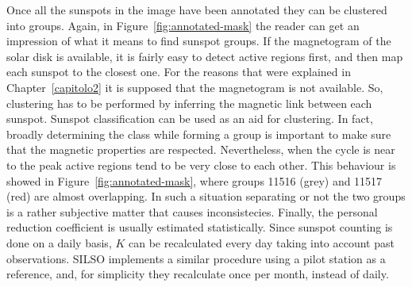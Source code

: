 \bigbreak
\noindent Once all the sunspots in the image have been annotated they can be clustered into groups. Again, in Figure~\ref{fig:annotated-mask} the reader can get an impression of what it means to find sunspot groups. If the magnetogram of the solar disk is available, it is fairly easy to detect active regions first, and then map each sunspot to the closest one. For the reasons that were explained in Chapter~\ref{capitolo2} it is supposed that the magnetogram is not available. So, clustering has to be performed by inferring the magnetic link between each sunspot. Sunspot classification can be used as an aid for clustering. In fact, broadly determining the class while forming a group is important to make sure that the magnetic properties are respected. Nevertheless, when the cycle is near to the peak active regions tend to be very close to each other. This behaviour is showed in Figure~\ref{fig:annotated-mask}, where groups 11516 (grey) and 11517 (red) are almost overlapping. In such a situation separating or not the two groups is a rather subjective matter that causes inconsistecies.
\bigbreak
\noindent Finally, the personal reduction coefficient is usually estimated statistically. Since sunspot counting is done on a daily basis, $K$ can be recalculated every day taking into account past observations. SILSO implements a similar procedure using a pilot station as a reference, and, for simplicity they recalculate once per month, instead of daily. \clearpage
